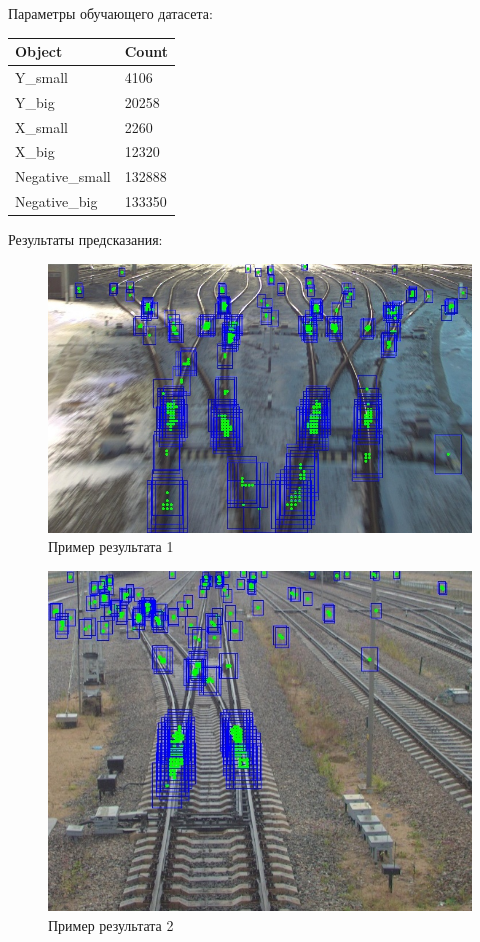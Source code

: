 Параметры обучающего датасета:
\begin{table}[!h]
	\begin{tabular}{|l|l|}
		\hline
		\textbf{Object} & \textbf{Count} \\ \hline
		Y\_small        & 4106           \\ \hline
		Y\_big          & 20258          \\ \hline
		X\_small        & 2260           \\ \hline
		X\_big          & 12320          \\ \hline
		Negative\_small & 132888         \\ \hline
		Negative\_big   & 133350         \\ \hline
	\end{tabular}
\end{table}

Результаты предсказания:
\begin{figure}[!h]
	\centering
	\includegraphics[width=0.8\linewidth]{pictures/screenshot2326}
	\caption{Пример результата 1}
	\label{fig:screenshot2326}
\end{figure}
\begin{figure}[h!]
	\centering
	\includegraphics[width=0.8\linewidth]{pictures/screenshot2327}
	\caption{Пример результата 2}
	\label{fig:screenshot2327}
\end{figure}\newpage
